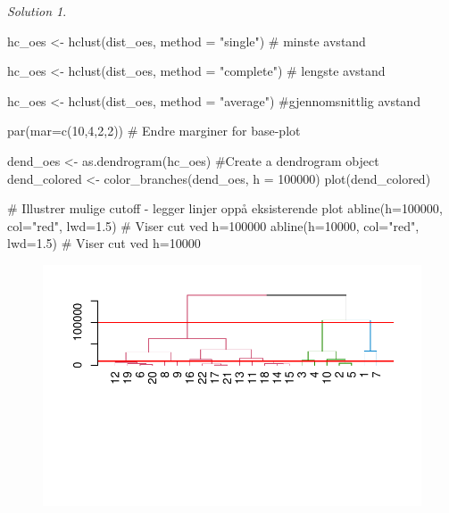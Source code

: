 \documentclass[
  letterpaper,
  DIV=11,
  numbers=noendperiod]{scrreprt}
\newenvironment{Shaded}{\begin{snugshade}}{\end{snugshade}}
\newcommand{\AttributeTok}[1]{\textcolor[rgb]{0.40,0.45,0.13}{#1}}
\newcommand{\CommentTok}[1]{\textcolor[rgb]{0.37,0.37,0.37}{#1}}
\newcommand{\DecValTok}[1]{\textcolor[rgb]{0.68,0.00,0.00}{#1}}
\newcommand{\FloatTok}[1]{\textcolor[rgb]{0.68,0.00,0.00}{#1}}
\newcommand{\FunctionTok}[1]{\textcolor[rgb]{0.28,0.35,0.67}{#1}}
\newcommand{\NormalTok}[1]{\textcolor[rgb]{0.00,0.23,0.31}{#1}}
\newcommand{\OtherTok}[1]{\textcolor[rgb]{0.00,0.23,0.31}{#1}}
\newcommand{\StringTok}[1]{\textcolor[rgb]{0.13,0.47,0.30}{#1}}
\theoremstyle{definition}
\theoremstyle{remark}
\newtheorem*{solution}{Solution}
\begin{document}
\begin{solution}
\begin{Shaded}
\begin{Highlighting}[]
\NormalTok{hc\_oes }\OtherTok{\textless{}{-}} \FunctionTok{hclust}\NormalTok{(dist\_oes, }\AttributeTok{method =} \StringTok{"single"}\NormalTok{)  }\CommentTok{\# minste avstand}

\NormalTok{hc\_oes }\OtherTok{\textless{}{-}} \FunctionTok{hclust}\NormalTok{(dist\_oes, }\AttributeTok{method =} \StringTok{"complete"}\NormalTok{) }\CommentTok{\# lengste avstand}

\NormalTok{hc\_oes }\OtherTok{\textless{}{-}} \FunctionTok{hclust}\NormalTok{(dist\_oes, }\AttributeTok{method =} \StringTok{"average"}\NormalTok{) }\CommentTok{\#gjennomsnittlig avstand}

\FunctionTok{par}\NormalTok{(}\AttributeTok{mar=}\FunctionTok{c}\NormalTok{(}\DecValTok{10}\NormalTok{,}\DecValTok{4}\NormalTok{,}\DecValTok{2}\NormalTok{,}\DecValTok{2}\NormalTok{))  }\CommentTok{\# Endre marginer for base{-}plot}

\NormalTok{dend\_oes }\OtherTok{\textless{}{-}} \FunctionTok{as.dendrogram}\NormalTok{(hc\_oes) }\CommentTok{\#Create a dendrogram object}
\NormalTok{dend\_colored }\OtherTok{\textless{}{-}} \FunctionTok{color\_branches}\NormalTok{(dend\_oes, }\AttributeTok{h =} \DecValTok{100000}\NormalTok{)}
\FunctionTok{plot}\NormalTok{(dend\_colored)}

\CommentTok{\# Illustrer mulige cutoff {-} legger linjer oppå eksisterende plot}
\FunctionTok{abline}\NormalTok{(}\AttributeTok{h=}\DecValTok{100000}\NormalTok{, }\AttributeTok{col=}\StringTok{"red"}\NormalTok{, }\AttributeTok{lwd=}\FloatTok{1.5}\NormalTok{)  }\CommentTok{\# Viser cut ved h=100000}
\FunctionTok{abline}\NormalTok{(}\AttributeTok{h=}\DecValTok{10000}\NormalTok{, }\AttributeTok{col=}\StringTok{"red"}\NormalTok{, }\AttributeTok{lwd=}\FloatTok{1.5}\NormalTok{)   }\CommentTok{\# Viser cut ved h=10000}
\end{Highlighting}
\end{Shaded}

\begin{figure}[H]

{\centering \includegraphics{./unsupervised_files/figure-pdf/unnamed-chunk-2-2.pdf}

}
\end{figure}
\end{solution}
\end{document}
